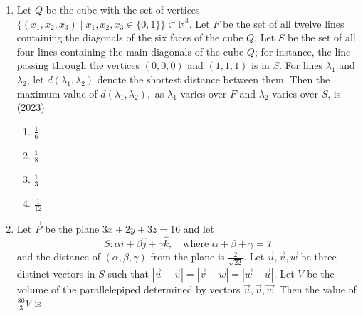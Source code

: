 \begin{enumerate}[label=\thesubsection.\arabic*.,ref=\thesubsection.\theenumi]
$$\myvec{
0 &-c_3& c_2\\
c_3&0&-c_1\\
-c_2&c_1&0 
}
\myvec{
1 \\
b_2 \\
b_3}
    =
\myvec{
3 - c_1\\
1 - c_2 \\
-1 - c_3}
$$
Then, which of the following statements is/are TRUE?
\hfill (2022)  
\begin{multicols}{4}     \begin{enumerate}
	\item $\vec{\overrightarrow{a}} \cdot \vec{\overrightarrow{c}}$ = 0
 	    \item $\vec{\overrightarrow{b}} \cdot \vec{\overrightarrow{c}}$ = 0
 	    \item $|\vec{\overrightarrow{b}}| > \sqrt{10}$
 	    \item $|\vec{\overrightarrow{c}}| \leq \sqrt{11}$
\end{enumerate} \end{multicols}
  \item Let $Q$ be the cube with the set of vertices $ \{(x_1, x_2, x_3) \mid x_1, x_2, x_3 \in \{0,1\} \} \subset \mathbb{R}^3$. Let $F$ be the set of all twelve lines containing the diagonals of the six faces of the cube $Q$. Let $S$ be the set of all four lines containing the main diagonals of the cube $Q$; for instance, the line passing through the vertices $(0,0,0)$ and $(1,1,1)$ is in $S$. For lines $\lambda_1$ and $\lambda_2$, let $ d(\lambda_1, \lambda_2) $ denote the shortest distance between them. Then the maximum value of $ d(\lambda_1, \lambda_2), $ as $\lambda_1$ varies over $F$ and $\lambda_2$ varies over $S$, is 
\hfill (2023)    
\begin{multicols}{4}     
\begin{enumerate}
 \item $\frac{1}{6}$
 \item $\frac{1}{8}$
 \item $\frac{1}{3}$
 \item $\frac{1}{12}$
\end{enumerate}
\end{multicols}
%
 \item Let $\vec{P}$ be the plane $3x + 2y + 3z = 16$ and let 
$$
S : \alpha \hat{i} + \beta \hat{j} + \gamma \hat{k}, \quad \text{where } \alpha + \beta + \gamma = 7
$$
and the distance of $(\alpha, \beta, \gamma)$ from the plane is $\frac{2}{\sqrt{22}}$.
Let $\vec{u}, \vec{v}, \vec{w}$ be three distinct vectors in $S$ such that $|\vec{u} - \vec{v}| = |\vec{v} - \vec{w}| = |\vec{w} - \vec{u}|$. Let $V$ be the volume of the parallelepiped determined by vectors $\vec{u}, \vec{v}, \vec{w}$. Then the value of $\frac{80}{3} V$ is

\end{enumerate}
